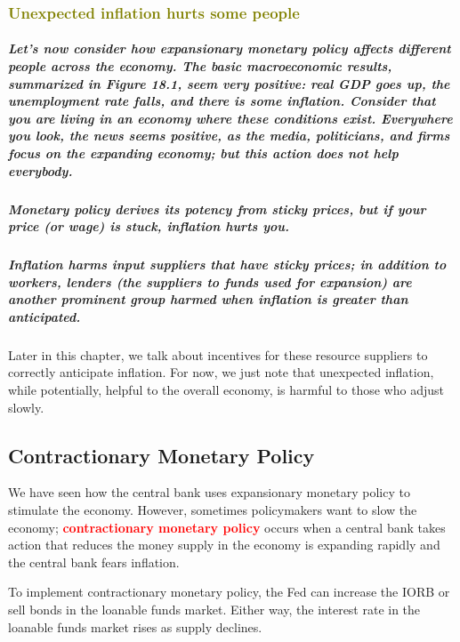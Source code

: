 \documentclass[11pt]{article} %
\begin{document}
\subsubsection*{\textcolor{olive}{Unexpected inflation hurts some people}}
\subparagraph*{Let's now consider how expansionary monetary policy affects different people across the economy. The basic macroeconomic results, summarized in Figure 18.1, seem very positive: real GDP goes up, the unemployment rate falls, and there is some inflation. Consider that you are living in an economy where these conditions exist. Everywhere you look, the news seems positive, as the media, politicians, and firms focus on the expanding economy; but this action does not help everybody.}
\subparagraph*{Monetary policy derives its potency from sticky prices, but if your price (or wage) is stuck, inflation hurts you.}
\subparagraph*{Inflation harms input suppliers that have sticky prices; in addition to workers, lenders (the suppliers to funds used for expansion) are another prominent group harmed when inflation is greater than anticipated.}
Later in this chapter, we talk about incentives for these resource suppliers to correctly anticipate inflation. For now, we just note that unexpected inflation, while potentially, helpful to the overall economy, is harmful to those who adjust slowly.
\subsection*{Contractionary Monetary Policy}
We have seen how the central bank uses expansionary monetary policy to stimulate the economy. However, sometimes policymakers want to slow the economy; \textbf{\textcolor{red}{contractionary monetary policy}} occurs when a central bank takes action that reduces the money supply in the economy is expanding rapidly and the central bank fears inflation.

To implement contractionary monetary policy, the Fed can increase the IORB or sell bonds in the loanable funds market. Either way, the interest rate in the loanable funds market rises as supply declines.
\end{document}
